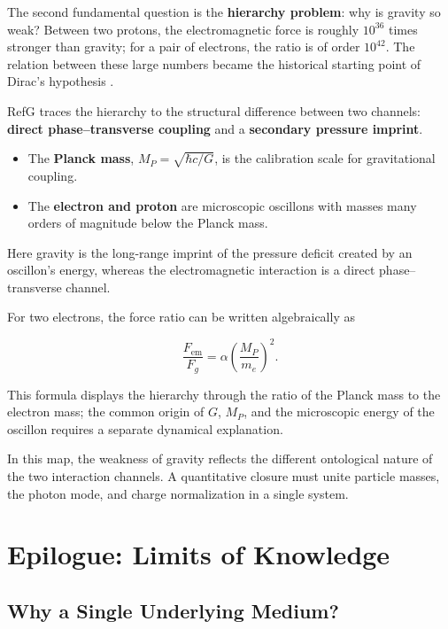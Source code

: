 \documentclass[11pt,a4paper]{article}
\begin{document}
The second fundamental question is the \textbf{hierarchy problem}: why is gravity so weak? Between two protons, the electromagnetic force is roughly $10^{36}$ times stronger than gravity; for a pair of electrons, the ratio is of order $10^{42}$. The relation between these large numbers became the historical starting point of Dirac's hypothesis \citep{dirac1937}.

RefG traces the hierarchy to the structural difference between two channels: \textbf{direct phase--transverse coupling} and a \textbf{secondary pressure imprint}.

\begin{itemize}
\item The \textbf{Planck mass}, $M_P=\sqrt{\hbar c/G}$, is the calibration scale for gravitational coupling.
\item The \textbf{electron and proton} are microscopic oscillons with masses many orders of magnitude below the Planck mass.
\end{itemize}

Here gravity is the long-range imprint of the pressure deficit created by an oscillon's energy, whereas the electromagnetic interaction is a direct phase--transverse channel.

For two electrons, the force ratio can be written algebraically as

\begin{equation}
\frac{F_{\mathrm{em}}}{F_g}=\alpha\left(\frac{M_P}{m_e}\right)^2.
\label{eq:force-hierarchy}
\end{equation}

This formula displays the hierarchy through the ratio of the Planck mass to the electron mass; the common origin of $G$, $M_P$, and the microscopic energy of the oscillon requires a separate dynamical explanation.

In this map, the weakness of gravity reflects the different ontological nature of the two interaction channels. A quantitative closure must unite particle masses, the photon mode, and charge normalization in a single system.

\section{Epilogue: Limits of Knowledge}

\subsection{Why a Single Underlying Medium?}
\end{document}
